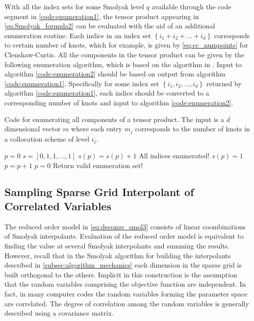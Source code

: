 With all the index sets for some Smolyak level $q$ available through the code segment in \ref{code:enumeration1}, the tensor product appearing in \ref{eq:Smolyak_formula2} can be evaluated with the aid of an additional enumeration routine. Each indice in an index set $\left\{i_1+i_2+...+i_d\right\}$ corresponds to certain number of knots, which for example, is given by \ref{eq:cc_numpoints} for Clenshaw-Curtis. All the components in the tensor product can be given by the following enumeration algorithm, which is based on the algorithm in \cite{Holtz}. Input to algorithm \ref{code:enumeration2} should be based on output from algorithm \ref{code:enumeration1}. Specifically for some index set $\left\{i_1,i_2,...,i_d\right\}$ returned by algorithm \ref{code:enumeration1}, each indice should be converted to a corresponding number of knots and input to algorithm \ref{code:enumeration2}.     
\begin{algorithm}
\caption{\label{code:enumeration2} 
Code for enumerating all components of a tensor product. The input is a $d$ dimensional vector $m$ where each entry $m_j$ corresponds to the number of knots in a collocation scheme of level $i_j$.} 
\begin{algorithmic}[1]
\State $p = 0$
\State $s = \left[0,1,1,...,1\right]$  
\Repeat 
   \State $s(p) = s(p) + 1$
         \State All indices enumerated!
      \Else
         \State $s(p) = 1$
         \State $p = p + 1$
      \EndIf
   \Else
      \State $p = 0$
      \State Return valid enumeration set!
   \EndIf
{} 
\end{algorithmic}
\end{algorithm}

\subsection{Sampling Sparse Grid Interpolant of Correlated Variables} \label{subsec:sampling_smolyak}

The reduced order model in \ref{eq:decomp_smol3} consists of linear coombinations of Smolyak interpolants. Evaluation of the reduced order model is equivalent to finding the value at several Smolyak interpolants and summing the results. However, recall that in the Smolyak algorithm for building the interpolants described in \ref{subsec:algorithm_mechanics} each dimension in the sparse grid is built orthogonal to the others. Implicit in this construction is the assumption that the random variables comprising the objective function are independent. In fact, in many computer codes the random variables forming the parameter space are correlated. The degree of correlation among the random variables is generally described using a covariance matrix. 

